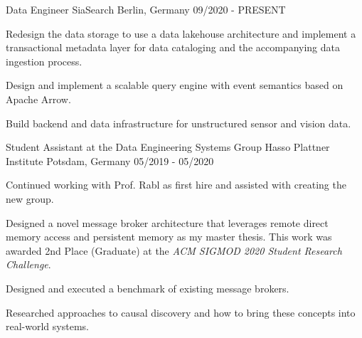 

\begin{cventries}

  \cventry
    {Data Engineer} %
    {SiaSearch} %
    {Berlin, Germany} %
    {09/2020 - PRESENT} %
    {
      \begin{cvitems} %
      \item{Redesign the data storage to use a data lakehouse architecture and implement a transactional metadata layer for data cataloging and the accompanying data ingestion process.}
      \item{Design and implement a scalable query engine with event semantics based on Apache Arrow.}
      \item{Build backend and data infrastructure for unstructured sensor and vision data.}
      \end{cvitems}
    }

  \cventry
    {Student Assistant at the Data Engineering Systems Group} %
    {Hasso Plattner Institute} %
    {Potsdam, Germany} %
    {05/2019 - 05/2020} %
    {
      \begin{cvitems} %
      \item{Continued working with Prof. Rabl as first hire and assisted with creating the new group.}
      \item{Designed a novel message broker architecture that leverages remote direct memory access and persistent memory as my master thesis. This work was awarded 2nd Place (Graduate) at the \textit{ACM SIGMOD 2020 Student Research Challenge}.}
      \item{Designed and executed a benchmark of existing message brokers.}
      \item{Researched approaches to causal discovery and how to bring these concepts into real-world systems.}
      \end{cvitems}
    }


\end{cventries}
